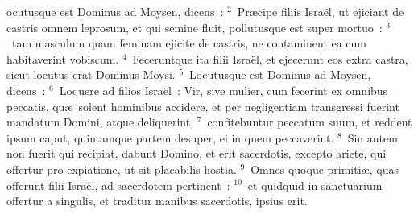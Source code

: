 \bchapter
{}ocutusque est Dominus ad Moysen, dicens~:
${}^{2}$~Pr\ae cipe filiis Isra\"el, ut ejiciant de castris omnem leprosum, et qui semine fluit, pollutusque est super mortuo~:
${}^{3}$~tam masculum quam feminam ejicite de castris, ne contaminent ea cum habitaverint vobiscum.
${}^{4}$~Feceruntque ita filii Isra\"el, et ejecerunt eos extra castra, sicut locutus erat Dominus Moysi.
${}^{5}$~Locutusque est Dominus ad Moysen, dicens~:
${}^{6}$~Loquere ad filios Isra\"el~: Vir, sive mulier, cum fecerint ex omnibus peccatis, qu\ae\ solent hominibus accidere, et per negligentiam transgressi fuerint mandatum Domini, atque deliquerint,
${}^{7}$~confitebuntur peccatum suum, et reddent ipsum caput, quintamque partem desuper, ei in quem peccaverint.
${}^{8}$~Sin autem non fuerit qui recipiat, dabunt Domino, et erit sacerdotis, excepto ariete, qui offertur pro expiatione, ut sit placabilis hostia.
${}^{9}$~Omnes quoque primiti\ae , quas offerunt filii Isra\"el, ad sacerdotem pertinent~:
${}^{10}$~et quidquid in sanctuarium offertur a singulis, et traditur manibus sacerdotis, ipsius erit.


